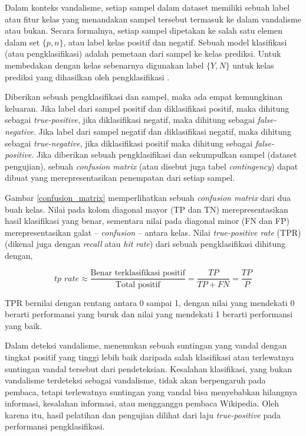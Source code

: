 
Dalam konteks vandalisme, setiap sampel dalam dataset memiliki sebuah label
atau fitur kelas yang menandakan sampel tersebut termasuk ke dalam vandalisme
atau bukan.
Secara formalnya, setiap sampel dipetakan ke salah satu elemen dalam set
$\{p, n\}$, atau label kelas positif dan negatif.
Sebuah model klasifikasi (atau pengklasifikasi) adalah pemetaan dari sampel ke
kelas prediksi.
Untuk membedakan dengan kelas sebenarnya digunakan label $\{Y, N\}$ untuk kelas
prediksi yang dihasilkan oleh pengklasifikasi
\parencite{fawcett2006introduction}.

\pagebreak
Diberikan sebuah pengklasifikasi dan sampel, maka ada empat kemungkinan
keluaran.
Jika label dari sampel positif dan diklasifikasi positif, maka dihitung sebagai
\textit{true-positive}, jika diklasifikasi negatif, maka dihitung sebagai
\textit{false-negative}.
Jika label dari sampel negatif dan diklasifikasi negatif, maka dihitung sebagai
\textit{true-negative}, jika diklasifikasi positif maka dihitung sebagai
\textit{false-positive}.
Jika diberikan sebuah pengklasifikasi dan sekumpulkan sampel (dataset
pengujian), sebuah \textit{confusion matrix} (atau disebut juga tabel
\textit{contingency}) dapat dibuat yang merepresentasikan penempatan dari
setiap sampel.



Gambar \ref{confusion_matrix} memperlihatkan sebuah \textit{confusion matrix}
dari dua buah kelas.
Nilai pada kolom diagonal mayor (TP dan TN) merepresentasikan hasil klasifikasi
yang benar, sementara nilai pada diagonal minor (FN dan FP) merepresentasikan
galat -- \textit{confusion} -- antara kelas.
Nilai \textit{true-positive rate} (TPR)
(dikenal juga dengan \textit{recall} atau \textit{hit rate}) dari sebuah
pengklasifikasi dihitung dengan,

\begin{equation}
	\textit{tp rate} \approx \frac{\text{Benar terklasifikasi positif}}%
		{\text{Total positif}}
		= \frac{TP}{TP + FN}
		= \frac{TP}{P}
\end{equation}

TPR bernilai dengan rentang antara 0 sampai 1, dengan nilai yang mendekati 0
berarti performansi yang buruk dan nilai yang mendekati 1 berarti performansi
yang baik.


\pagebreak

Dalam deteksi vandalisme, menemukan sebuah suntingan yang vandal dengan tingkat
positif yang tinggi lebih baik daripada salah klasifikasi atau terlewatnya
suntingan vandal tersebut dari pendeteksian.
Kesalahan klasifikasi, yang bukan vandalisme terdeteksi sebagai vandalisme,
tidak akan berpengaruh pada pembaca, tetapi terlewatnya suntingan yang vandal
bisa menyebabkan hilangnya informasi, kesalahan informasi, atau mengganggu
pembaca Wikipedia.
Oleh karena itu, hasil pelatihan dan pengujian dilihat dari laju
\textit{true-positive} pada performansi pengklasifikasi.
